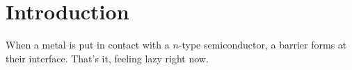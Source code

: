 \section{Introduction}
When a metal is put in contact with a $n$-type semiconductor, a barrier forms at their interface.
That's it, feeling lazy right now.